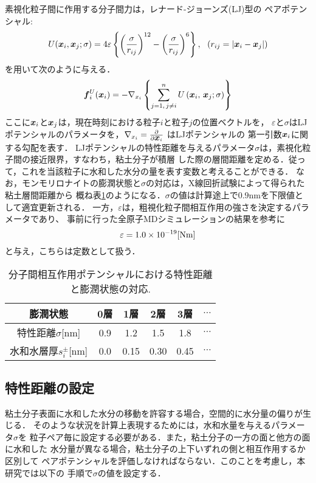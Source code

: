 素視化粒子間に作用する分子間力は，レナード-ジョーンズ(LJ)型の
ペアポテンシャル:
\begin{equation}
	U(\mbox{\boldmath $x$}_i,\mbox{\boldmath $x$}_j; \sigma) 
	= 4 \varepsilon 
	\left\{ 
	\left(\frac{\sigma}{r_{ij}}\right)^{12}
	-
	\left(\frac{\sigma}{r_{ij}}\right)^6
	\right\}, \ \ \left( r_{ij}=\left| \mbox{\boldmath $x$}_i-\mbox{\boldmath $x$}_j\right| \right)
	\label{eqn:LJ}
\end{equation}
を用いて次のように与える．
\begin{equation}
	\mbox{\boldmath $f$}_i^U(\mbox{\boldmath $x$}_i)
	=
	-\nabla_{x_i} 
	\left\{ 
		\sum_{j=1, \, j \neq i}^n U\left(\mbox{\boldmath $x$}_i,\,\mbox{\boldmath $x$}_j; \sigma \right)
	\right\}
	\label{eqn:fiU}
\end{equation}
ここに$\mbox{\boldmath $x$}_i$と$\mbox{\boldmath $x$}_j$は，現在時刻における粒子$i$と粒子$j$の位置ベクトルを，
$\varepsilon$と$\sigma$はLJポテンシャルのパラメータを，$\nabla_{x_i}=\frac{\partial}{\partial \mbox{\boldmath $x$}_i}$
はLJポテンシャルの 第一引数$\mbox{\boldmath $x$}_i$に関する勾配を表す．
LJポテンシャルの特性距離を与えるパラメータ$\sigma$は，素視化粒子間の接近限界，すなわち，粘土分子が積層
した際の層間距離を定める．従って，これを当該粒子に水和した水分の量を表す変数と考えることができる．
なお，モンモリロナイトの膨潤状態と$\sigma$の対応は，X線回折試験によって得られた粘土層間距離から
概ね表\ref{tbl:tbl_sig}のようになる．$\sigma$の値は計算途上で$0.9$nmを下限値として適宜更新される．
一方，$\varepsilon$は，粗視化粒子間相互作用の強さを決定するパラメータであり、
事前に行った全原子MDシミュレーションの結果を参考に
\begin{equation}
	\varepsilon=1.0\times 10^{-19}[{\rm Nm}]
	\label{eqn:LJ_eps}
\end{equation}
と与え，こちらは定数として扱う．
\begin{table}[h]
	\begin{center}
	\caption{分子間相互作用ポテンシャルにおける特性距離と膨潤状態の対応.}
	\vspace{3mm}
	\begin{tabular}{c||c|c|c|c|c}
		膨潤状態 & 0層 & 1層 & 2層 & 3層 & $\cdots$\\
		\hline
		特性距離$\sigma$[{\rm nm}]& 0.9 & 1.2 & 1.5 & 1.8 & $\cdots$ \\
		\hline
		水和水層厚$s^\pm_i$[{\rm nm}] & 0.0 & 0.15 & 0.30 & 0.45 & $\cdots$
	\end{tabular}
	\label{tbl:tbl_sig}
	\end{center}
\end{table}
\subsection{特性距離の設定}
粘土分子表面に水和した水分の移動を許容する場合，空間的に水分量の偏りが生じる．
そのような状況を計算上表現するためには，水和水量を与えるパラメータ$\sigma$を
粒子ペア毎に設定する必要がある．また，粘土分子の一方の面と他方の面に水和した
水分量が異なる場合，粘土分子の上下いずれの側と相互作用するか区別して
ペアポテンシャルを評価しなければならない．このことを考慮し，本研究では以下の
手順で$\sigma$の値を設定する．

